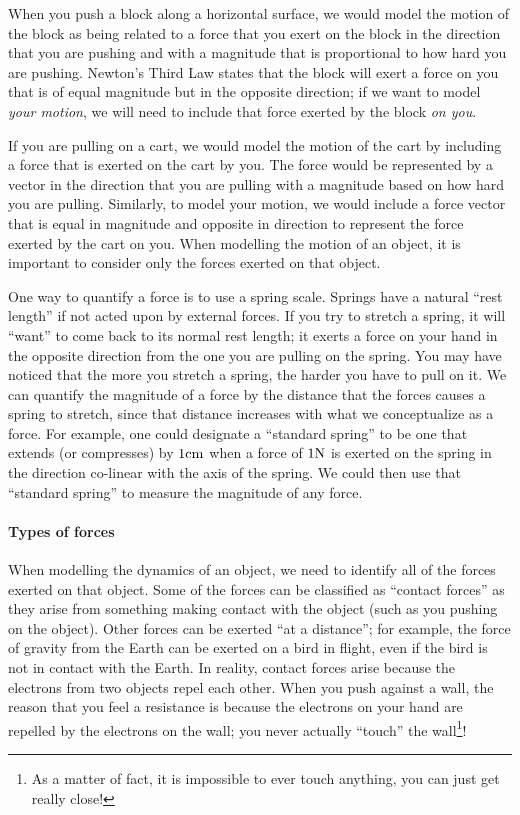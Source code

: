 When you push a block along a horizontal surface, we would model the motion of the block as being related to a force that you exert on the block in the direction that you are pushing and with a magnitude that is proportional to how hard you are pushing. Newton's Third Law states that the block will exert a force on you that is of equal magnitude but in the opposite direction; if we want to model \textit{your motion}, we will need to include that force exerted by the block \textit{on you}.

If you are pulling on a cart, we would model the motion of the cart by including a force that is exerted on the cart by you. The force would be represented by a vector in the direction that you are pulling with a magnitude based on how hard you are pulling. Similarly, to model your motion, we would include a force vector that is equal in magnitude and opposite in direction to represent the force exerted by the cart on you. When modelling the motion of an object, it is important to consider only the forces exerted on that object.

One way to quantify a force is to use a spring scale. Springs have a natural ``rest length'' if not acted upon by external forces. If you try to stretch a spring, it will ``want'' to come back to its normal rest length; it exerts a force on your hand in the opposite direction from the one you are pulling on the spring. You may have noticed that the more you stretch a spring, the harder you have to pull on it. We can quantify the magnitude of a force by the distance that the forces causes a spring to stretch, since that distance increases with what we conceptualize as a force. For example, one could designate a ``standard spring'' to be one that extends (or compresses) by $1 {\rm cm}$ when a force of $1 {\rm N}$ is exerted on the spring in the direction co-linear with the axis of the spring. We could then use that ``standard spring'' to measure the magnitude of any force.

\paragraph{Types of forces}\label{sec:newtonslaws:typesofforces}

When modelling the dynamics of an object, we need to identify all of the forces exerted on that object. Some of the forces can be classified as ``contact forces'' as they arise from something making contact with the object (such as you pushing on the object). Other forces can be exerted ``at a distance''; for example, the force of gravity from the Earth can be exerted on a bird in flight, even if the bird is not in contact with the Earth. In reality, contact forces arise because the electrons from two objects repel each other. When you push against a wall, the reason that you feel a resistance is because the electrons on your hand are repelled by the electrons on the wall; you never actually ``touch'' the wall\footnote{As a matter of fact, it is impossible to ever touch anything, you can just get really close!}!

